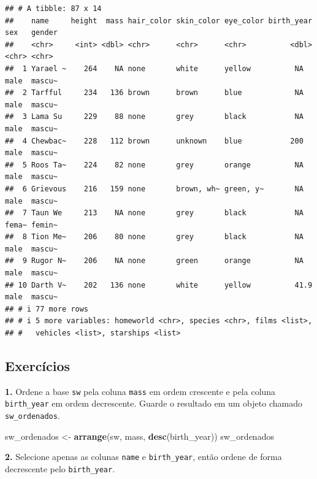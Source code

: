 \documentclass[
]{book}
\newenvironment{Shaded}{\begin{snugshade}}{\end{snugshade}}
\newcommand{\FunctionTok}[1]{\textcolor[rgb]{0.13,0.29,0.53}{\textbf{#1}}}
\newcommand{\NormalTok}[1]{#1}
\newcommand{\OtherTok}[1]{\textcolor[rgb]{0.56,0.35,0.01}{#1}}
\begin{document}
\begin{verbatim}
## # A tibble: 87 x 14
##    name     height  mass hair_color skin_color eye_color birth_year sex   gender
##    <chr>     <int> <dbl> <chr>      <chr>      <chr>          <dbl> <chr> <chr> 
##  1 Yarael ~    264    NA none       white      yellow          NA   male  mascu~
##  2 Tarfful     234   136 brown      brown      blue            NA   male  mascu~
##  3 Lama Su     229    88 none       grey       black           NA   male  mascu~
##  4 Chewbac~    228   112 brown      unknown    blue           200   male  mascu~
##  5 Roos Ta~    224    82 none       grey       orange          NA   male  mascu~
##  6 Grievous    216   159 none       brown, wh~ green, y~       NA   male  mascu~
##  7 Taun We     213    NA none       grey       black           NA   fema~ femin~
##  8 Tion Me~    206    80 none       grey       black           NA   male  mascu~
##  9 Rugor N~    206    NA none       green      orange          NA   male  mascu~
## 10 Darth V~    202   136 none       white      yellow          41.9 male  mascu~
## # i 77 more rows
## # i 5 more variables: homeworld <chr>, species <chr>, films <list>,
## #   vehicles <list>, starships <list>
\end{verbatim}

\subsection{Exercícios}\label{exercuxedcios-15}

\textbf{1.} Ordene a base \texttt{sw} pela coluna \texttt{mass} em ordem crescente e pela
coluna \texttt{birth\_year} em ordem decrescente. Guarde o resultado em um
objeto chamado \texttt{sw\_ordenados}.

\begin{Shaded}
\begin{Highlighting}[]
\NormalTok{sw\_ordenados }\OtherTok{\textless{}{-}} \FunctionTok{arrange}\NormalTok{(sw, mass, }\FunctionTok{desc}\NormalTok{(birth\_year))}
\NormalTok{sw\_ordenados}
\end{Highlighting}
\end{Shaded}

\textbf{2.} Selecione apenas as colunas \texttt{name} e \texttt{birth\_year}, então ordene
de forma decrescente pelo \texttt{birth\_year}.
\end{document}
